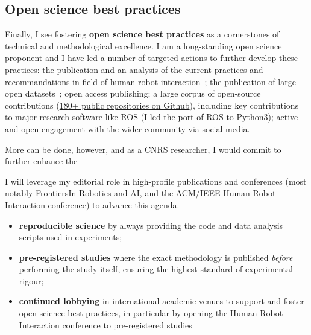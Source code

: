 \subsection{Open science best practices}

Finally, I see fostering \textbf{open science best practices} as a cornerstones
of technical and methodological excellence. I am a long-standing open science
proponent and I have led a number of targeted actions to further develop these
practices: the publication and an analysis of the current practices and
recommandations in field of human-robot
interaction~\autocite{baxter2016characterising}; the publication of large open
datasets~\autocite{childrenspeech2016, pinsoro2018, lemaignan2018pinsoro}; open
access publishing; a large corpus of open-source contributions
(\href{https://github.com/severin-lemaignan}{180+ public repositories on
Github}), including key contributions to major research software like ROS (I led
the port of ROS to Python3); active and open engagement with the wider community
via social media.

More can be done, however, and as a CNRS researcher, I would commit to further
enhance the 

I will leverage my editorial role in high-profile publications and
conferences (most notably FrontiersIn Robotics and AI, and the ACM/IEEE
Human-Robot Interaction conference) to advance this agenda.

\begin{itemize}
    \item \textbf{reproducible science} by always providing the code and data
        analysis scripts used in experiments;
    \item \textbf{pre-registered studies} where the exact methodology is
        published \emph{before} performing the study itself, ensuring the
        highest standard of experimental rigour;
    \item \textbf{continued lobbying} in international academic venues to
        support and foster open-science best practices, in particular by opening
        the Human-Robot Interaction conference to pre-registered studies
\end{itemize}



